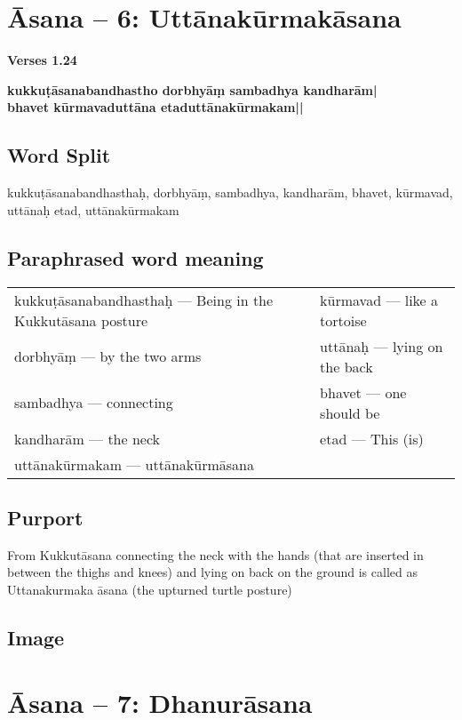 \section*{Āsana -- 6: Uttānakūrmakāsana}

\noindent \textbf{Verses 1.24}

\begin{shloka}
\textbf{kukkuṭāsanabandhastho dorbhyāṃ sambadhya kandharām|}\\
\textbf{bhavet kūrmavaduttāna etaduttānakūrmakam||}
\end{shloka}

\subsection*{Word Split}

kukkuṭāsanabandhasthaḥ,  dorbhyāṃ, sambadhya,  kandharām, bhavet,  kūrmavad, uttānaḥ etad, uttānakūrmakam

\subsection*{Paraphrased word meaning}

\begin{longtable}{>{\noindent\raggedright}p{5cm}>{\noindent\raggedright}p{5cm}}
kukkuṭāsanabandhasthaḥ --- Being in the Kukkutāsana posture  & kūrmavad --- like a tortoise\tabularnewline
dorbhyāṃ --- by the two arms  & uttānaḥ --- lying on the back\tabularnewline
sambadhya --- connecting  & bhavet  --- one should be\tabularnewline
kandharām --- the neck  & etad --- This (is)\tabularnewline
uttānakūrmakam --- uttānakūrmāsana & 
\end{longtable}

\subsection*{Purport}

From Kukkutāsana connecting the neck with the hands (that are inserted in between the thighs and knees) and lying on back on the ground is called as Uttanakurmaka āsana (the upturned turtle posture)

\subsection*{Image}
\newpage

\section*{Āsana -- 7: Dhanurāsana}

